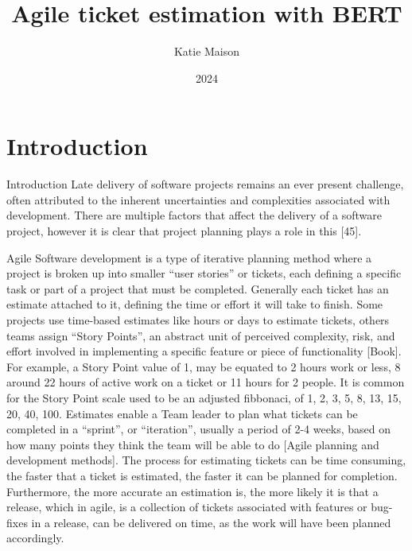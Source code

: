 \documentclass{UoYCSproject}
\author{Katie Maison}
\title{Agile ticket estimation with BERT}
\date{2024}
\begin{document}
\setcounter{page}{1}

\maketitle
\listoffigures
\listoftables

\chapter{Introduction}
\label{ch:introduction}
\setcounter{page}{1}

Introduction
Late delivery of software projects remains an ever present challenge, often attributed to the inherent uncertainties and complexities associated with development.
There are multiple factors that affect the delivery of a software project, however it is clear that project planning plays a role in this [45]. \par
Agile Software development is a type of iterative planning method where a project is broken up into smaller “user stories” or tickets, each defining a specific task or part of a project that must be completed.
Generally each ticket has an estimate attached to it, defining the time or effort it will take to finish.
Some projects use time-based estimates like hours or days to estimate tickets, others teams assign “Story Points”, an abstract unit of perceived complexity, risk, and effort involved in implementing a specific feature or piece of functionality [Book].
For example, a Story Point value of 1, may be equated to 2 hours work or less, 8 around 22 hours of active work on a ticket or 11 hours for 2 people.
It is common for the Story Point scale used to be an adjusted fibbonaci, of 1, 2, 3, 5, 8, 13, 15, 20, 40, 100.
Estimates enable a Team leader to plan what tickets can be completed in a “sprint”, or “iteration”, usually a period of 2-4 weeks, based on how many points they think the team will be able to do [Agile planning and development methods].
The process for estimating tickets can be time consuming, the faster that a ticket is estimated, the faster it can be planned for completion.
Furthermore, the more accurate an estimation is, the more likely it is that a release, which in agile, is a collection of tickets associated with features or bug-fixes in a release, can be delivered on time, as the work will have been planned accordingly. \par
\end{document}
